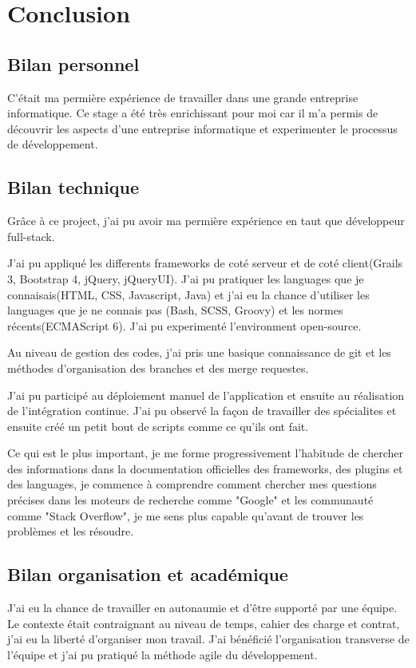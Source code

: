 \chapter{Conclusion}
\label{chap:Conclusion}

\section{Bilan personnel}
C'était ma permière expérience de travailler dans une grande entreprise informatique.
Ce stage a été très enrichissant pour moi car
il m’a permis de découvrir les aspects d'une entreprise informatique et experimenter le processus de développement.

\section{Bilan technique}
Grâce à ce project, j'ai pu avoir ma permière expérience en taut que développeur full-stack.

J'ai pu appliqué les differents frameworks de coté serveur et de coté client(Grails 3, Bootstrap 4, jQuery, jQueryUI).
J'ai pu pratiquer les languages que je connaisais(HTML, CSS, Javascript, Java)
et j'ai eu la chance d'utiliser les languages que je ne connais pas (Bash, SCSS, Groovy) et les normes récents(ECMAScript 6).
J'ai pu experimenté l'environment open-source.

Au niveau de gestion des codes, j'ai pris une basique connaissance de git et les méthodes d'organisation des branches et des merge requestes.

J'ai pu participé au déploiement manuel de l'application et ensuite au réalisation de l'intégration continue.
J'ai pu observé la façon de travailler des spécialites et ensuite créé un petit bout de scripts comme ce qu'ils ont fait.

Ce qui est le plus important,
je me forme progressivement l'habitude de chercher des informations dans la documentation officielles des frameworks, des plugins et des languages,
je commence à comprendre comment chercher mes questions précises dans les moteurs de recherche comme "Google" et les communauté comme "Stack Overflow",
je me sens plus capable qu'avant de trouver les problèmes et les résoudre.

\section{Bilan organisation et académique}
J'ai eu la chance de travailler en autonaumie et d'être supporté par une équipe.
Le contexte était contraignant au niveau de temps, cahier des charge et contrat,
j'ai eu la liberté d'organiser mon travail.
J'ai bénéficié l'organisation transverse de l'équipe et j'ai pu pratiqué la méthode agile du développement.
